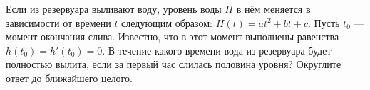 
Если из резервуара выливают воду, уровень воды $H$ в нём меняется в зависимости от времени $t$ следующим образом: 
$H(t)=at^2+bt+c$. Пусть $t_0$ — момент окончания слива. Известно, что в этот момент выполнены равенства 
$h(t_0)= h'(t_0)=0$. В течение какого времени вода из резервуара будет полностью вылита, если за первый час слилась половина уровня? 
Округлите ответ до ближайшего целого.

\soultionSection

